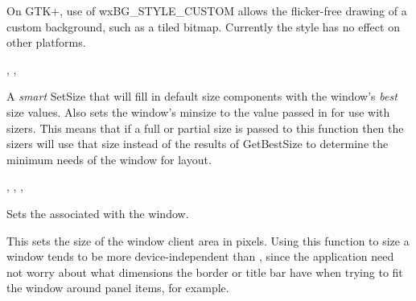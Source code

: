 On GTK+, use of wxBG\_STYLE\_CUSTOM allows the flicker-free drawing of a custom
background, such as a tiled bitmap. Currently the style has no effect on other platforms.


,\rtfsp
{},\rtfsp
{}


\label{wxwindowsetbestfittingsize}


A {\it smart} SetSize that will fill in default size components with the
window's {\it best} size values.  Also sets the window's minsize to
the value passed in for use with sizers.  This means that if a full or
partial size is passed to this function then the sizers will use that
size instead of the results of GetBestSize to determine the minimum
needs of the window for layout.


,\rtfsp
{},\rtfsp
{},\rtfsp
{}


\label{wxwindowsetcaret}


Sets the  associated with the window.


\label{wxwindowsetclientsize}



This sets the size of the window client area in pixels. Using this function to size a window
tends to be more device-independent than , since the application need not
worry about what dimensions the border or title bar have when trying to fit the window
around panel items, for example.


